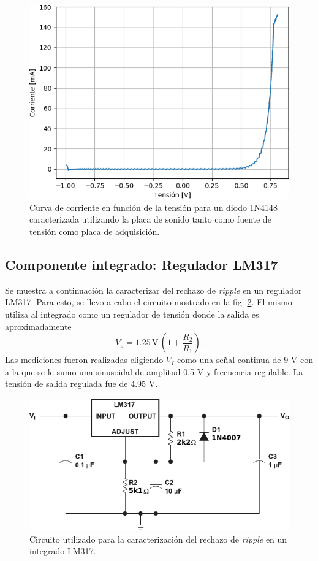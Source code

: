 \documentclass[a4paper,11pt]{article}
\begin{document}
	\begin{figure}[h]
		\centering
		\includegraphics[width=\textwidth]{imagenes/Diodo1N4148.png}
		\caption{Curva de corriente en función de la tensión para un diodo 1N4148 caracterizada utilizando la placa de sonido tanto como fuente de tensión como placa de adquisición.}
		\label{fig:diodo}
	\end{figure}
	
	\subsection{Componente integrado: Regulador LM317}	\label{sec:integrado}
	
Se muestra a continuación la caracterizar del rechazo de \textit{ripple} en un regulador LM317. Para esto, se llevo a cabo el circuito mostrado en la fig. \ref{fig:lm317}. El mismo utiliza al integrado como un regulador de tensión donde la salida es aproximadamente
\begin{equation}\label{eq:vout}
V_o = 1.25\, \mathrm{V}\, (1 + \frac{R_2}{R_1}).
\end{equation}
Las mediciones fueron realizadas eligiendo $V_I$ como una señal continua de 9 V con a la que se le sumo una sinusoidal de amplitud 0.5 V y frecuencia regulable. La tensión de salida regulada fue de 4.95 V. 

	\begin{figure}[h]
	\centering
		\includegraphics[width=\textwidth]{imagenes/lm317.pdf}
		\caption{Circuito utilizado para la caracterización del rechazo de \textit{ripple} en un integrado LM317.}
		\label{fig:lm317}
	\end{figure}
\end{document}
